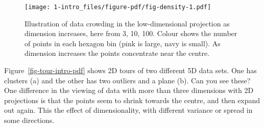\documentclass[
  letterpaper,
]{krantz}
\begin{document}

\begin{figure}

{\centering \texttt{[image: 1-intro\_files/figure-pdf/fig-density-1.pdf]}

}

\caption{\label{fig-density}Illustration of data crowding in the
low-dimensional projection as dimension increases, here from 3, 10, 100.
Colour shows the number of points in each hexagon bin (pink is large,
navy is small). As dimension increases the points concentrate near the
centre.}

\end{figure}

Figure~\ref{fig-tour-intro-pdf} shows 2D tours of two different 5D data
sets. One has clusters (a) and the other has two outliers and a plane
(b). Can you see these? One difference in the viewing of data with more
than three dimensions with 2D projections is that the points seem to
shrink towards the centre, and then expand out again. This the effect of
dimensionality, with different variance or spread in some directions.
\end{document}
